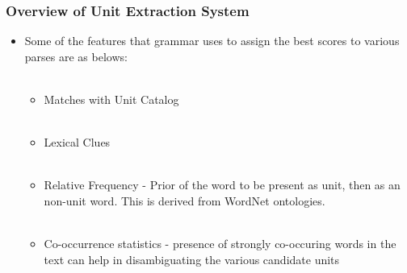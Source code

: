 \documentclass{beamer}
\begin{document}
\begin{frame}
 \frametitle{Overview of Unit Extraction System}
 \begin{itemize}
  \item Some of the features that grammar uses to assign the best scores to various 
parses are as belows: \pause \\~\\
    \begin{itemize}
        \item Matches with Unit Catalog \pause \\~\\
	\item Lexical Clues \pause \\~\\
	\item Relative Frequency - Prior of the word to be present as unit, then as an
	  non-unit word. This is derived from WordNet ontologies. \pause \\~\\
	\item Co-occurrence statistics - presence of strongly co-occuring words in the
	  text can help in disambiguating the various candidate units 
    \end{itemize}
 \end{itemize}
 
\end{frame}
\end{document}
